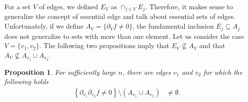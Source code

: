 \documentclass[reqno]{amsart}
\newtheorem{proposition}{Proposition}
\begin{document}
For a set $V$ of edges, we defined $E_V$ as $\cap_{j\in V} E_j$. Therefore, it makes sense to generalize the concept of essential edge and talk about essential sets of edges. Unfortunately, if we define $A_V=\{\partial_{V}f\neq 0\}$, the fundamental inclusion $E_j\subseteq A_j$ does not generalize to sets with more than one element. Let us consider the case $V=\{v_1,v_2\}$.
The following two propositions imply that $E_V\not\subseteq A_V$ and that $A_V\not\subseteq A_{v_1}\cup A_{v_2}$. 


\begin{proposition}\label{thm|entanglementDoesNotImplyInfluentiall}
For sufficiently large $n$, there are edges $v_1$ and $v_2$ for which the following holds
\begin{align}
\left\{\partial_{v_1}\partial_{v_2}f\neq 0\right\}\setminus\left(A_{v_1}\cup A_{v_2}\right) &\neq \emptyset.
\label{eqn|entanglementDoesNotImplyInfluentiall}
\end{align}
\end{proposition}
\end{document}
